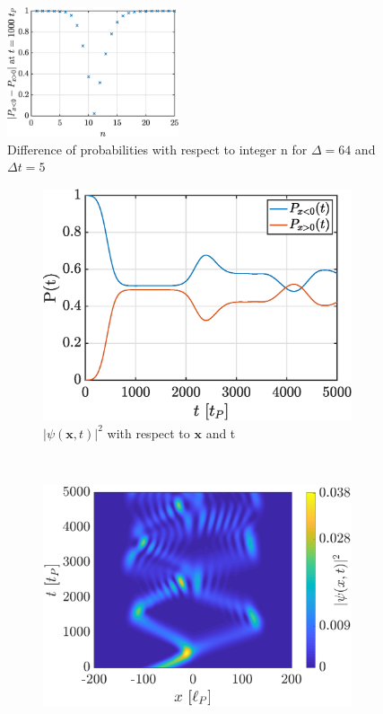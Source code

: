 \documentclass[a4paper,12pt,twoside]{article}
\newcommand{\mbf}[1]{\mathbf{#1}} %
\begin{document}
\begin{figure}[h]
  \centering
  \includegraphics[width=0.45\textwidth]{graphs/iii_findn_n.eps}
  \caption{Difference of probabilities with respect to integer n for $\Delta = 64$ and $\Delta t = 5$}
  \label{fig:iii_findn_n}
\end{figure}


\begin{figure}[h]
  \centering
  \begin{subfigure}[t]{0.45\textwidth}
    \includegraphics[width=\textwidth]{graphs/iii_findn_prob.eps}
    \caption{$|\psi(\mbf{x}, t)|^2$ with respect to $\mbf{x}$ and t}
    \label{fig:iii_findn_prob}
  \end{subfigure}
  ~
  \begin{subfigure}[t]{0.45\textwidth}
    \includegraphics[width=\textwidth]{graphs/iii_findn_evo.eps}

\end{subfigure}
\end{figure}
\end{document}
